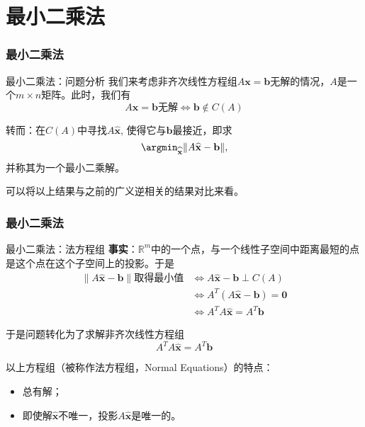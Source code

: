 
\section{最小二乘法}


\begin{frame}
\frametitle{最小二乘法}

\begin{block}{最小二乘法：问题分析}
我们来考虑非齐次线性方程组$A\mathbf{x} = \mathbf{b}$无解的情况，$A$是一个$m\times n$矩阵。此时，我们有
$$A\mathbf{x} = \mathbf{b}\text{无解} \Longleftrightarrow \mathbf{b}\not\in C(A)$$

转而：在$C(A)$中寻找$A\widehat{\mathbf{x}}$, 使得它与$\mathbf{b}$最接近，即求
$$\argmin_{\widehat{\mathbf{x}}}\lVert A\widehat{\mathbf{x}} - \mathbf{b} \rVert,$$
并称其为一个最小二乘解。

\vspace{2em}
可以将以上结果与之前的广义逆相关的结果对比来看。
\end{block}

\end{frame}


\begin{frame}
\frametitle{最小二乘法}

\begin{block}{最小二乘法：法方程组}
{\bfseries 事实}：$\mathbb{R}^m$中的一个点，与一个线性子空间中距离最短的点是这个点在这个子空间上的投影。于是
\begin{align*}
\lVert A\widehat{\mathbf{x}} - \mathbf{b} \rVert \text{取得最小值} & \Longleftrightarrow A\widehat{\mathbf{x}} - \mathbf{b} \perp C(A) \\
& \Longleftrightarrow A^T (A\widehat{\mathbf{x}} - \mathbf{b}) = \mathbf{0} \\
& \Longleftrightarrow A^TA\widehat{\mathbf{x}} = A^T\mathbf{b}
\end{align*}

于是问题转化为了求解非齐次线性方程组
$$A^TA\widehat{\mathbf{x}} = A^T\mathbf{b}$$

\vspace{1em}
\pause

以上方程组（被称作法方程组，Normal Equations）的特点：
\begin{itemize}
\item 总有解；
\item 即使解$\widehat{\mathbf{x}}$不唯一，投影$A\widehat{\mathbf{x}}$是唯一的。
\end{itemize}
\end{block}

\end{frame}

